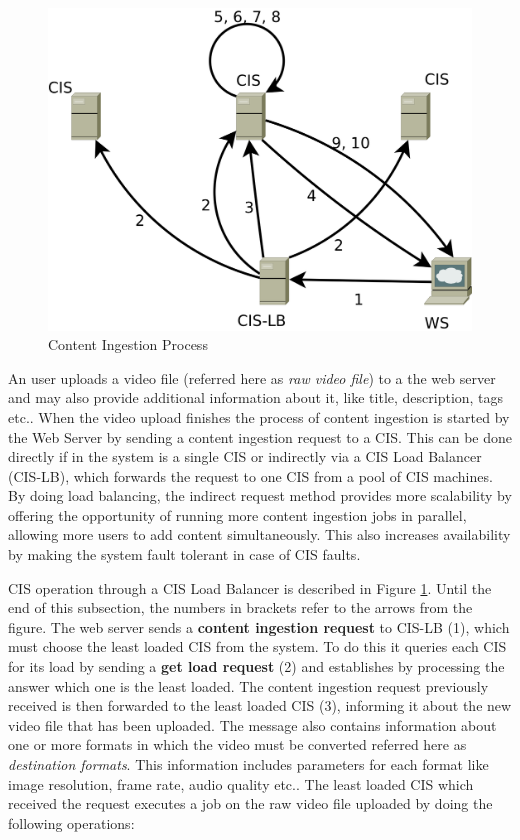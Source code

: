 \begin{figure}[h]
  \begin{center}
    \includegraphics[width=\columnwidth]{img/content-ingestion.png}
  \end{center}
  \caption{Content Ingestion Process}
  \label{fig:content-ingestion}
\end{figure}

An user uploads a video file (referred here as \textit{raw video file}) to a the web server and may also provide additional information about it, like title, description, tags etc.. When the video upload finishes the process of content ingestion is started by the Web Server by sending a content ingestion request to a CIS. This can be done directly if in the system is a single CIS or indirectly via a CIS Load Balancer (CIS-LB), which forwards the request to one CIS from a pool of CIS machines. By doing load balancing, the indirect request method provides more scalability by offering the opportunity of running more content ingestion jobs in parallel, allowing more users to add content simultaneously. This also increases availability by making the system fault tolerant in case of CIS faults.

CIS operation through a CIS Load Balancer is described in Figure \ref{fig:content-ingestion}. Until the end of this subsection, the numbers in brackets refer to the arrows from the figure. The web server sends a \textbf{content ingestion request} to CIS-LB (1), which must choose the least loaded CIS from the system. To do this it queries each CIS for its load by sending a \textbf{get load request} (2) and establishes by processing the answer which one is the least loaded. The content ingestion request previously received is then forwarded to the least loaded CIS (3), informing it about the new video file that has been uploaded. The message also contains information about one or more formats in which the video must be converted referred here as \textit{destination formats}. This information includes parameters for each format like image resolution, frame rate, audio quality etc.. The least loaded CIS which received the request executes a job on the raw video file uploaded by doing the following operations:

